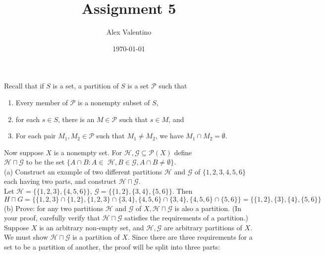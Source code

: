 \documentclass[12pt, letterpaper]{article}
\date{\today}
\author{Alex Valentino}
\title{Assignment 5}
\newcommand{\Hs}{\mathcal{H}}
\newcommand{\G}{\mathcal{G}}
\begin{document}
	Recall that if $S$ is a set, a partition of $S$ is a set $\mathcal{P}$ such that 
	\begin{enumerate}
	\item Every member of $\mathcal{P}$ is a nonempty subset of $S$,
	\item for each $s \in S$, there is an $M \in \mathcal{P}$ such that $s \in M$, and
	\item For each pair $M_1, M_2 \in \mathcal{P}$ such that $M_1 \neq M_2$, we have $M_1 \cap M_2=\emptyset$.
	\end{enumerate} 
	Now suppose $X$ is a nonempty set. For $\mathcal{H}, \mathcal{G} \subseteq \mathcal{P}(X)$ define\\ $\mathcal{H} \sqcap \mathcal{G}$ to be the set $\{A \cap B: A \in$ $\mathcal{H}, B \in \mathcal{G}, A \cap B \neq \emptyset\}$.\\
(a) Construct an example of two different partitions $\mathcal{H}$ and $\mathcal{G}$ of $\{1,2,3,4,5,6\}$ each having two parts, and construct $\mathcal{H} \sqcap \mathcal{G}$.\\
Let $\mathcal{H} =\{\{1,2,3\},\{4,5,6\}\}$, $\mathcal{G} = \{\{1,2\},\{3,4\},\{5,6\}\}$.  Then $H \sqcap G = \{\{1,2,3\} \cap \{1,2\}, \{1,2,3\} \cap \{3,4\}, \{4,5,6\} \cap \{3,4\}, \{4,5,6\} \cap \{5,6\}\} = \{\{1,2\},\{3\},\{4\},\{5,6\}\}$\\
(b) Prove: for any two partitions $\mathcal{H}$ and $\mathcal{G}$ of $X, \mathcal{H} \sqcap \mathcal{G}$ is also a partition. (In your proof, carefully verify that $\mathcal{H} \sqcap \mathcal{G}$ satisfies the requirements of a partition.)\\
Suppose $X$ is an arbitrary non-empty set, and $\Hs, \G$ are arbitrary partitions of $X$.  We must show $\Hs \sqcap \G$ is a partition of $X$.  Since there are three requirements for a set to be a partition of another, the proof will be split into three parts:
\end{document}

